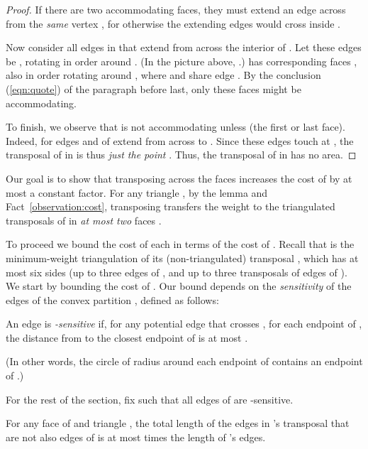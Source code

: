 \documentclass[final]{siamltex}
\begin{document}
\begin{proof}
If there are two accommodating faces, they must extend an edge across  
from the {\em same} vertex , for otherwise the extending edges would cross inside .

Now consider all edges in  that extend from  across the interior of .
Let these edges be , rotating in order around .
(In the picture above, .)
 has  corresponding faces , 
also in order rotating around ,
where  and  share edge .
By the conclusion (\ref{eqn:quote}) of the paragraph before last,
only these  faces might be accommodating.

 To finish, we observe that  is not accommodating
unless  (the first or last face).
Indeed, for  edges  and  of  
extend from  across  to .
Since these edges touch at ,
the transposal of  in  is thus {\em just the point }.
Thus, the transposal of  in  has no area.
\end{proof}

Our goal is to show that transposing  across the faces
increases the cost of  by at most a constant factor.
For any triangle , 
by the lemma and Fact~\ref{observation:cost}, 
transposing 
transfers the weight  
to the triangulated transposals  of 
in {\em at most two} faces .

To proceed we bound the cost of each
 in terms of the cost of .
Recall that  is the minimum-weight triangulation of
its (non-triangulated) transposal ,
which has at most six sides (up to three edges of ,
and up to three transposals of edges of ).
We start by bounding the cost of .
Our bound depends on the {\em sensitivity} of the edges of the convex partition ,
defined as follows:

\begin{definition}[sensitivity]\label{def:sensitivity}
An edge  is {\em -sensitive} if, 
  for any potential edge  that crosses ,
  for each endpoint  of ,
  the distance from  to the closest endpoint of 
  is at most .
\end{definition}

(In other words, the circle of radius 
around each endpoint of  contains an endpoint of .)

For the rest of the section, fix  
such that all edges of  are -sensitive.

\begin{lemma}\label{lemma:sensitive}
For any face  of  and triangle ,
  the total length of the edges in 's transposal 
  that are not also edges of 
  is at most  times the length of 's edges.
\end{lemma}
\end{document}
